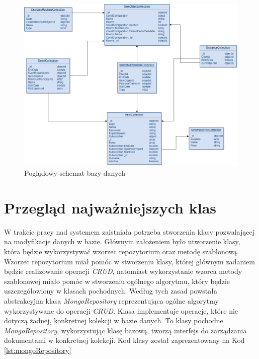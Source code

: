 \documentclass[a4paper,twoside,12pt]{book}
\begin{document}
\begin{figure}[H]
	\centering
	\includegraphics[width=1\linewidth]{../diagramy/schemat_bazy}
	\caption{Poglądowy schemat bazy danych}
	\label{fig:schematbazy}
\end{figure}

\section{Przegląd najważniejszych klas}
W trakcie pracy nad systemem zaistniała potrzeba stworzenia klasy pozwalającej na modyfikacje danych w bazie. Głównym założeniem było utworzenie klasy, która będzie wykorzystywać wzorzec repozytorium oraz metodę szablonową. Wzorzec repozytorium miał pomóc w stworzeniu klasy, której głównym zadaniem będzie realizowanie operacji \textit{CRUD}, natomiast wykorzystanie wzorca metody szablonowej miało pomóc w stworzeniu ogólnego algorytmu, który będzie uszczegółowiony w klasach pochodnych. Według tych zasad powstała abstrakcyjna klasa \textit{MongoRepository} reprezentująca ogólne algorytmy wykorzystywane do operacji \textit{CRUD}. Klasa implementuje operacje, które nie dotyczą żadnej, konkretnej kolekcji w bazie danych. To klasy pochodne \textit{MongoRepository}, wykorzystując klasę bazową, tworzą interfejs do zarządzania dokumentami w konkretnej kolekcji. Kod klasy został zaprezentowany na Kod \ref{lst:mongoRepository}
\end{document}
